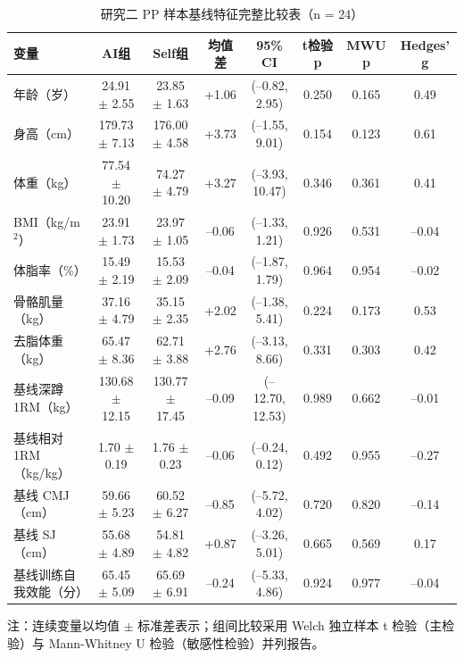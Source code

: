 \begin{landscape}
\thispagestyle{empty}
\begin{table}[htbp]
\centering
\caption{研究二 PP 样本基线特征完整比较表（n = 24）}
\label{tab:app_baseline_full}
\begin{threeparttable}
\begin{tabular}{lccccccc}
\toprule
变量 & AI组 & Self组 & 均值差 & 95\% CI & t检验 p & MWU p & Hedges' g \\
\midrule
年龄（岁）                & 24.91 $\pm$ 2.55     & 23.85 $\pm$ 1.63     & +1.06  & (--0.82, 2.95)    & 0.250 & 0.165 & 0.49 \\
身高（cm）                & 179.73 $\pm$ 7.13    & 176.00 $\pm$ 4.58    & +3.73  & (--1.55, 9.01)    & 0.154 & 0.123 & 0.61 \\
体重（kg）                & 77.54 $\pm$ 10.20    & 74.27 $\pm$ 4.79     & +3.27  & (--3.93, 10.47)   & 0.346 & 0.361 & 0.41 \\
BMI（kg/m$^2$）           & 23.91 $\pm$ 1.73     & 23.97 $\pm$ 1.05     & --0.06 & (--1.33, 1.21)    & 0.926 & 0.531 & --0.04 \\
体脂率（\%）              & 15.49 $\pm$ 2.19     & 15.53 $\pm$ 2.09     & --0.04 & (--1.87, 1.79)    & 0.964 & 0.954 & --0.02 \\
骨骼肌量（kg）            & 37.16 $\pm$ 4.79     & 35.15 $\pm$ 2.35     & +2.02  & (--1.38, 5.41)    & 0.224 & 0.173 & 0.53 \\
去脂体重（kg）            & 65.47 $\pm$ 8.36     & 62.71 $\pm$ 3.88     & +2.76  & (--3.13, 8.66)    & 0.331 & 0.303 & 0.42 \\
基线深蹲 1RM（kg）        & 130.68 $\pm$ 12.15   & 130.77 $\pm$ 17.45   & --0.09 & (--12.70, 12.53)  & 0.989 & 0.662 & --0.01 \\
基线相对 1RM（kg/kg）     & 1.70 $\pm$ 0.19      & 1.76 $\pm$ 0.23      & --0.06 & (--0.24, 0.12)    & 0.492 & 0.955 & --0.27 \\
基线 CMJ（cm）            & 59.66 $\pm$ 5.23     & 60.52 $\pm$ 6.27     & --0.85 & (--5.72, 4.02)    & 0.720 & 0.820 & --0.14 \\
基线 SJ（cm）             & 55.68 $\pm$ 4.89     & 54.81 $\pm$ 4.82     & +0.87  & (--3.26, 5.01)    & 0.665 & 0.569 & 0.17 \\
基线训练自我效能（分）    & 65.45 $\pm$ 5.09     & 65.69 $\pm$ 6.91     & --0.24 & (--5.33, 4.86)    & 0.924 & 0.977 & --0.04 \\
\bottomrule
\end{tabular}
\begin{tablenotes}[flushleft]\footnotesize
\item 注：连续变量以均值 $\pm$ 标准差表示；组间比较采用 Welch 独立样本 t 检验（主检验）与 Mann-Whitney U 检验（敏感性检验）并列报告。
\end{tablenotes}
\end{threeparttable}
\end{table}
\end{landscape}

